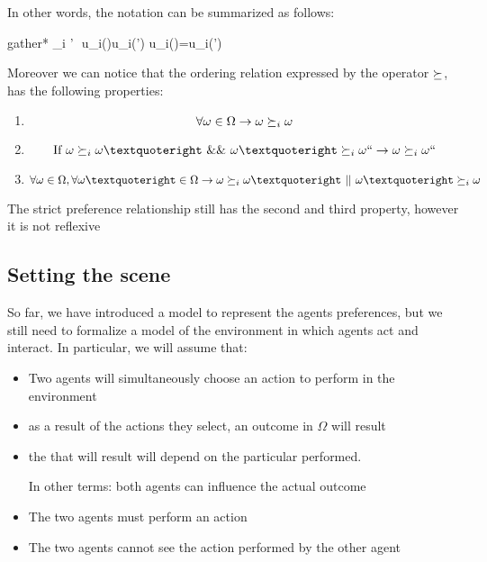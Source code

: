 	In other words, the notation can be summarized as follows:
	\begin{empheq}[box=%
	\fbox]{gather*}
		\omega \cmore_i \omega’ \,\iff\,u_i(\omega)\ge u_i(\omega’) u_i(\omega)=u_i(\omega’)
	\end{empheq}
	
	Moreover we can notice that the ordering relation expressed by the operator $\succeq$, has the following properties:
	\begin{enumerate}
	\item {}
	\[\forall \omega \in \Omega\rightarrow \omega\succeq_i\omega\]
	\item {}
	\[\text{If } \omega \cge_i\omega’ \text{ \&\& } \omega’\cge_i\omega`` \rightarrow \omega \cge_i\omega``\]
	\item {}
	\[\forall \omega\in \Omega, \forall \omega’\in\Omega\rightarrow \omega\cge_i\omega’\text{ || } \omega’\cge_i\omega\]
	\end{enumerate}
	The strict preference relationship still has the second and third property, however it is not reflexive
	
\subsection{Setting the scene}
So far, we have introduced a model to represent the agents preferences, but we still need to formalize a model of the environment in which agents act and interact. In particular, we will assume that:
	\begin{itemize}
	\item Two agents will simultaneously choose an action to perform in the environment
	\item as a result of the actions they select, an outcome in $\Omega$ will result
	\item the  that will result will depend on the particular  performed.
	
	In other terms: both agents can influence the actual outcome 
	\item The two agents must perform an action
	\item The two agents cannot see the action performed by the other agent
	\end{itemize}
	
